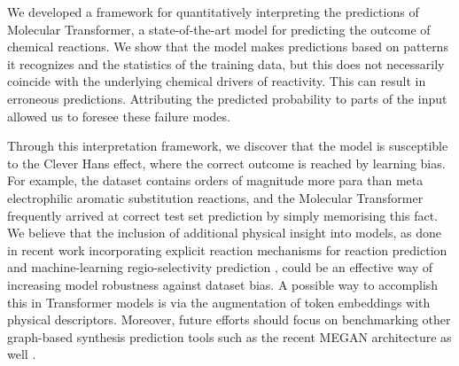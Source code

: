 

We developed a framework for quantitatively interpreting the predictions of Molecular Transformer, a state-of-the-art model for predicting the outcome of chemical reactions. We show that the model makes predictions based on patterns it recognizes and the statistics of the training data, but this does not necessarily coincide with the underlying chemical drivers of reactivity. This can result in erroneous predictions. Attributing the predicted probability to parts of the input allowed us to foresee these failure modes. 

Through this interpretation framework, we discover that the model is susceptible to the Clever Hans effect, where the correct outcome is reached by learning bias. For example, the dataset contains orders of magnitude more para than meta electrophilic aromatic substitution reactions, and the Molecular Transformer frequently arrived at correct test set prediction by simply memorising this fact. We believe that the inclusion of additional physical insight into models, as done in recent work incorporating explicit reaction mechanisms for reaction prediction \cite{bradshaw2019generative} and machine-learning regio-selectivity prediction \cite{guan_coley_robust}, could be an effective way of increasing model robustness against dataset bias. A possible way to accomplish this in Transformer models is via the augmentation of token embeddings with physical descriptors. Moreover, future efforts should focus on benchmarking other graph-based synthesis prediction tools such as the recent MEGAN architecture as well \cite{sacha2020molecule}.

